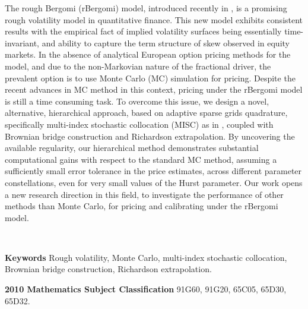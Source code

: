 
The rough Bergomi (rBergomi) model, introduced recently in  \cite{bayer2016pricing}, is a promising rough volatility model in quantitative finance. This new model exhibits consistent results with the empirical fact of implied volatility surfaces being essentially time-invariant, and  ability to capture the term structure of skew observed in equity markets. In the absence of analytical European option pricing methods for the model, and due to the non-Markovian nature of the fractional driver, the prevalent option is to use Monte Carlo (MC) simulation for pricing. Despite the recent advances in MC method in this context, pricing under the rBergomi model is still a time consuming task. To overcome this issue, we design a novel,  alternative, hierarchical approach, based on adaptive sparse grids quadrature, specifically  multi-index stochastic collocation (MISC) as in  \cite{haji2016multi}, coupled with Brownian bridge construction and Richardson extrapolation. By uncovering the available regularity,  our hierarchical method demonstrates substantial computational gains with respect to the standard MC method, assuming a sufficiently small error tolerance in the price estimates, across different parameter constellations, even for very small values of the Hurst  parameter. Our work opens a new research direction in this field, to investigate the performance of other methods than Monte Carlo, for pricing and calibrating under the rBergomi model.

\

\textbf{Keywords} Rough volatility, Monte Carlo, multi-index stochastic collocation, Brownian bridge construction, Richardson extrapolation.

\textbf{2010 Mathematics Subject Classification} 	91G60, 	91G20, 65C05, 65D30, 65D32.